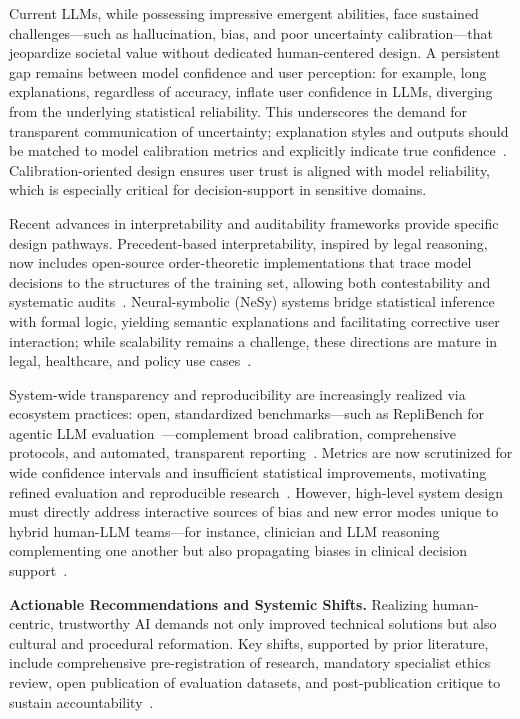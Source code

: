 \documentclass[sigconf]{acmart}
\begin{document}
Current LLMs, while possessing impressive emergent abilities, face sustained challenges—such as hallucination, bias, and poor uncertainty calibration—that jeopardize societal value without dedicated human-centered design. A persistent gap remains between model confidence and user perception: for example, long explanations, regardless of accuracy, inflate user confidence in LLMs, diverging from the underlying statistical reliability. This underscores the demand for transparent communication of uncertainty; explanation styles and outputs should be matched to model calibration metrics and explicitly indicate true confidence~\cite{ref35}. Calibration-oriented design ensures user trust is aligned with model reliability, which is especially critical for decision-support in sensitive domains.

Recent advances in interpretability and auditability frameworks provide specific design pathways. Precedent-based interpretability, inspired by legal reasoning, now includes open-source order-theoretic implementations that trace model decisions to the structures of the training set, allowing both contestability and systematic audits~\cite{ref46}. Neural-symbolic (NeSy) systems bridge statistical inference with formal logic, yielding semantic explanations and facilitating corrective user interaction; while scalability remains a challenge, these directions are mature in legal, healthcare, and policy use cases~\cite{ref44,ref52}.

System-wide transparency and reproducibility are increasingly realized via ecosystem practices: open, standardized benchmarks—such as RepliBench for agentic LLM evaluation~\cite{ref23}—complement broad calibration, comprehensive protocols, and automated, transparent reporting~\cite{ref23,ref42}. Metrics are now scrutinized for wide confidence intervals and insufficient statistical improvements, motivating refined evaluation and reproducible research~\cite{ref42}. However, high-level system design must directly address interactive sources of bias and new error modes unique to hybrid human-LLM teams—for instance, clinician and LLM reasoning complementing one another but also propagating biases in clinical decision support~\cite{ref53,ref52}.

\textbf{Actionable Recommendations and Systemic Shifts.} Realizing human-centric, trustworthy AI demands not only improved technical solutions but also cultural and procedural reformation. Key shifts, supported by prior literature, include comprehensive pre-registration of research, mandatory specialist ethics review, open publication of evaluation datasets, and post-publication critique to sustain accountability~\cite{ref40,ref53,ref52}. 
\end{document}
